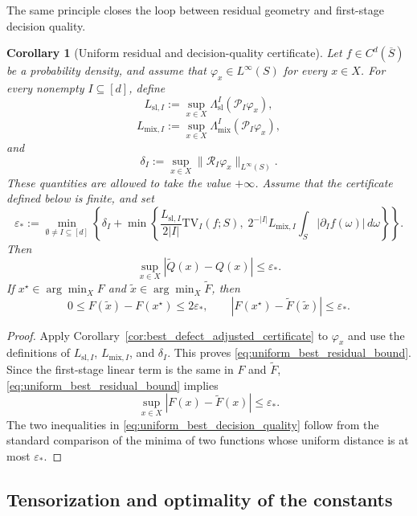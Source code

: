 \documentclass[11pt,letterpaper]{article}
\newtheorem{corollary}[theorem]{Corollary}
\theoremstyle{definition}
\theoremstyle{remark}
\newcommand{\TV}{\mathrm{TV}}
\begin{document}
The same principle closes the loop between residual geometry and first-stage
decision quality.

\begin{corollary}[Uniform residual and decision-quality certificate]
\label{cor:uniform_decision_quality_certificate}
Let $f\in C^d(\overline S)$ be a probability density, and assume that
$\varphi_x\in L^\infty(S)$ for every $x\in X$. For every nonempty
$I\subseteq[d]$, define
$$
L_{\mathrm{sl},I}
:=
\sup_{x\in X}
\Lambda_{\mathrm{sl}}^I(\mathcal P_I\varphi_x),
$$
$$
L_{\mathrm{mix},I}
:=
\sup_{x\in X}
\Lambda_{\mathrm{mix}}^I(\mathcal P_I\varphi_x),
$$
and
$$
\delta_I
:=
\sup_{x\in X}
\|\mathcal R_I\varphi_x\|_{L^\infty(S)}.
$$
These quantities are allowed to take the value $+\infty$. Assume that the
certificate defined below is finite, and set
\begin{equation}
\label{eq:def_uniform_best_certificate}
\varepsilon_*
:=
\min_{\emptyset\neq I\subseteq[d]}
\left\{
\delta_I
+
\min\left
\{
\frac{L_{\mathrm{sl},I}}{2|I|}\TV_I(f;S),
\;
2^{-|I|}L_{\mathrm{mix},I}
\int_S|\partial_I f(\omega)|\,d\omega
\right\}
\right\}.
\end{equation}
Then
\begin{equation}
\label{eq:uniform_best_residual_bound}
\sup_{x\in X}|\widetilde Q(x)-Q(x)|
\le
\varepsilon_*.
\end{equation}
If $x^\star\in\arg\min_XF$ and
$\widetilde x\in\arg\min_X\widetilde F$, then
\begin{equation}
\label{eq:uniform_best_decision_quality}
0
\le
F(\widetilde x)-F(x^\star)
\le
2\varepsilon_*,
\qquad
|F(x^\star)-\widetilde F(\widetilde x)|
\le
\varepsilon_*.
\end{equation}
\end{corollary}

\begin{proof}
Apply Corollary~\ref{cor:best_defect_adjusted_certificate} to $\varphi_x$ and
use the definitions of $L_{\mathrm{sl},I}$, $L_{\mathrm{mix},I}$, and
$\delta_I$. This proves \eqref{eq:uniform_best_residual_bound}. Since the
first-stage linear term is the same in $F$ and $\widetilde F$,
\eqref{eq:uniform_best_residual_bound} implies
$$
\sup_{x\in X}|F(x)-\widetilde F(x)|\le\varepsilon_*.
$$
The two inequalities in \eqref{eq:uniform_best_decision_quality} follow from
the standard comparison of the minima of two functions whose uniform distance
is at most $\varepsilon_*$.
\end{proof}

  
\subsection{Tensorization and optimality of the constants}
\label{subsec:main_tensorization_sharpness}
  
\end{document}
